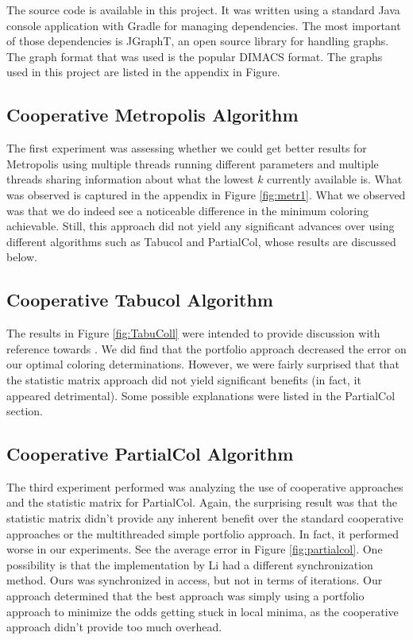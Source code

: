 \documentclass[runningheads]{llncs}
\begin{document}
The source code is available in this project. It was written using a standard Java console application with Gradle for managing dependencies. The most important of those dependencies is JGraphT, an open source library for handling graphs. The graph format that was used is the popular DIMACS format. The graphs used in this project are listed in the appendix in Figure.

\subsection{Cooperative Metropolis Algorithm}

The first experiment was assessing whether we could get better results for Metropolis using multiple threads running different parameters and multiple threads sharing information about what the lowest $k$ currently available is. What was observed is captured in the appendix in Figure \ref{fig:metr1}. What we observed was that we do indeed see a noticeable difference in the minimum coloring achievable. Still, this approach did not yield any significant advances over using different algorithms such as Tabucol and PartialCol, whose results are discussed below.

\subsection{Cooperative Tabucol Algorithm}

The results in Figure \ref{fig:TabuColl} were intended to provide discussion with reference towards \cite{https://doi.org/10.5445/ir/1000083192}. We did find that the portfolio approach decreased the error on our optimal coloring determinations. However, we were fairly surprised that that the statistic matrix approach did not yield significant benefits (in fact, it appeared detrimental). Some possible explanations were listed in the PartialCol section.

\subsection{Cooperative PartialCol Algorithm}

The third experiment performed was analyzing the use of cooperative approaches and the statistic matrix for PartialCol. Again, the surprising result was that the statistic matrix didn't provide any inherent benefit over the standard cooperative approaches or the multithreaded simple portfolio approach. In fact, it performed worse in our experiments. See the average error in Figure \ref{fig:partialcol}.
One possibility is that the implementation by Li had a different synchronization method. Ours was synchronized in access, but not in terms of iterations. Our approach determined that the best approach was simply using a portfolio approach to minimize the odds getting stuck in local minima, as the cooperative approach didn't provide too much overhead.
\end{document}
